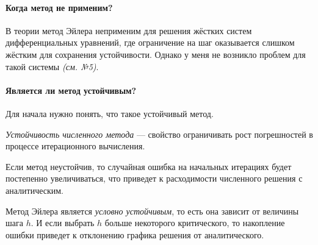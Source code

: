 \paragraph{Когда метод не применим?}
В теории метод Эйлера неприменим для решения жёстких систем дифференциальных уравнений, где ограничение на шаг оказывается слишком жёстким для сохранения устойчивости. Однако у меня не возникло проблем для такой системы \textit{(см. №5)}.

\paragraph{Является ли метод устойчивым?} Для начала нужно понять, что такое устойчивый метод.

\textit{Устойчивость численного метода} --- свойство ограничивать рост погрешностей в процессе итерационного вычисления.

Если метод неустойчив, то случайная ошибка на начальных итерациях будет постепенно увеличиваться, что приведет к расходимости численного решения с аналитическим. 

Метод Эйлера является \textit{условно устойчивым}, то есть она зависит от величины шага $h$. И если выбрать $h$ больше некоторого критического, то накопление ошибки приведет к отклонению графика решения от аналитического.
